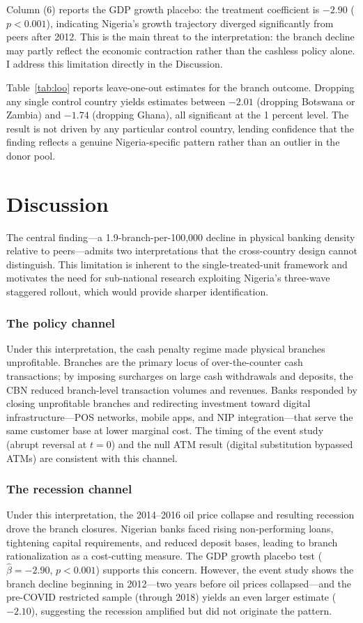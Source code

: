 \documentclass[12pt]{article}
\begin{document}
Column (6) reports the GDP growth placebo: the treatment coefficient is $-2.90$ ($p < 0.001$), indicating Nigeria's growth trajectory diverged significantly from peers after 2012. This is the main threat to the interpretation: the branch decline may partly reflect the economic contraction rather than the cashless policy alone. I address this limitation directly in the Discussion.



Table~\ref{tab:loo} reports leave-one-out estimates for the branch outcome. Dropping any single control country yields estimates between $-2.01$ (dropping Botswana or Zambia) and $-1.74$ (dropping Ghana), all significant at the 1 percent level. The result is not driven by any particular control country, lending confidence that the finding reflects a genuine Nigeria-specific pattern rather than an outlier in the donor pool.

\section{Discussion}

The central finding---a 1.9-branch-per-100,000 decline in physical banking density relative to peers---admits two interpretations that the cross-country design cannot distinguish. This limitation is inherent to the single-treated-unit framework and motivates the need for sub-national research exploiting Nigeria's three-wave staggered rollout, which would provide sharper identification.

\subsubsection*{The policy channel} Under this interpretation, the cash penalty regime made physical branches unprofitable. Branches are the primary locus of over-the-counter cash transactions; by imposing surcharges on large cash withdrawals and deposits, the CBN reduced branch-level transaction volumes and revenues. Banks responded by closing unprofitable branches and redirecting investment toward digital infrastructure---POS networks, mobile apps, and NIP integration---that serve the same customer base at lower marginal cost. The timing of the event study (abrupt reversal at $t = 0$) and the null ATM result (digital substitution bypassed ATMs) are consistent with this channel.

\subsubsection*{The recession channel} Under this interpretation, the 2014--2016 oil price collapse and resulting recession drove the branch closures. Nigerian banks faced rising non-performing loans, tightening capital requirements, and reduced deposit bases, leading to branch rationalization as a cost-cutting measure. The GDP growth placebo test ($\hat{\beta} = -2.90$, $p < 0.001$) supports this concern. However, the event study shows the branch decline beginning in 2012---two years before oil prices collapsed---and the pre-COVID restricted sample (through 2018) yields an even larger estimate ($-2.10$), suggesting the recession amplified but did not originate the pattern.
\end{document}
